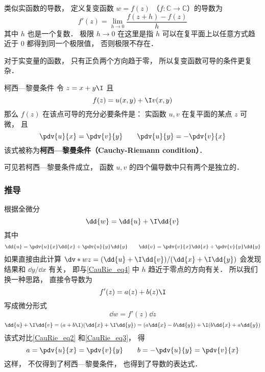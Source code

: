 
\begin{issues}
\issueDraft
\end{issues}


\begin{definition}{}
类似实函数的导数， 定义复变函数 $w = f(z)$ （$f:\mathbb C\to \mathbb C$）的导数为
\begin{equation}\label{CauRie_eq4}
f'(z) = \lim_{h\to 0} \frac{f(z + h) - f(z)}{h}
\end{equation}
其中 $h$ 也是一个复数． 极限 $h \to 0$ 在这里是指 $h$ 可以在复平面上以任意方式趋近于 $0$ 都得到同一个极限值， 否则极限不存在．
\end{definition}

对于实变量的函数， 只有正负两个方向趋于零， 所以复变函数可导的条件更复杂．

\begin{theorem}{柯西—黎曼条件}
令 $z = x + y\I$ 且
\begin{equation}
f(z) = u(x, y) + \I v(x, y)
\end{equation}
那么 $f(z)$ 在该点可导的充分必要条件是： 实函数 $u,v$ 在复平面的某点 $z$ 可微， 且
\begin{equation}\label{CauRie_eq1}
\pdv{u}{x} = \pdv{v}{y} \qquad
\pdv{u}{y} = - \pdv{v}{x}
\end{equation}
该式被称为\textbf{柯西—黎曼条件（Cauchy-Riemann condition）}．
\end{theorem}
可见若柯西—黎曼条件成立， 函数 $u,v$ 的四个偏导数中只有两个是独立的．

\subsubsection{推导}
根据全微分
\begin{equation}\label{CauRie_eq2}
\dd{w} = \dd{u} + \I \dd{v}
\end{equation}
其中
\begin{equation}\label{CauRie_eq3}
\dd{u} = \pdv{u}{x} \dd{x} + \pdv{u}{y} \dd{y} \qquad
\dd{v} = \pdv{v}{x} \dd{x} + \pdv{v}{y} \dd{y}
\end{equation}
如果直接由此计算 $\dv*{w}{z} = (\dd{u} + \I \dd{v})/(\dd{x} + \I \dd{y})$ 会发现结果和 $\dd{y}/\dd{x}$ 有关， 即与\autoref{CauRie_eq4} 中 $h$ 趋近于零点的方向有关． 所以我们换一种思路， 直接令导数为
\begin{equation}
f'(z) = a(z) + b(z)\I
\end{equation}
写成微分形式
\begin{equation}
\dd{w} = f'(z)\dd{z}
\end{equation}
\begin{equation}
\dd{u} + \I \dd{v} = (a + b\I)(\dd{x} + \I\dd{y}) = (a \dd{x} - b\dd{y}) + \I (b \dd{x} + a\dd{y})
\end{equation}
该式对比\autoref{CauRie_eq2} 和\autoref{CauRie_eq3}， 得
\begin{equation}
a = \pdv{u}{x} = \pdv{v}{y} \qquad
b = -\pdv{u}{y} = \pdv{v}{x}
\end{equation}
这样， 不仅得到了柯西—黎曼条件， 也得到了导数的表达式．

